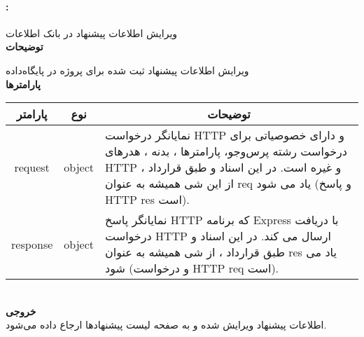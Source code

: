 \paragraph{:}
ویرایش اطلاعات پیشنهاد در بانک اطلاعات
\\
\textbf{توضیحات}
\hr
\begin{flushleft}
	\framebox[.9\textwidth][l]{
		\lr{
			\textcolor{type}{void}
			\textcolor{func}{postEditRequest}
			\textcolor{symb}{(}
			\textcolor{type}{object}
			\textcolor{arg}{request}
			\textcolor{symb}{,}
			\textcolor{type}{object}
			\textcolor{arg}{response}
			\textcolor{symb}{);}
		}
	}
\end{flushleft}
ویرایش اطلاعات پیشنهاد ثبت شده برای پروژه در پایگاه‌داده
\\
\textbf{پارامترها}
\hr \\[10pt]
\begin{tabular}{|m{4cm}|m{3cm}|m{10cm}|}
	\hline
	\multicolumn{1}{|c}{پارامتر}
	&
	\multicolumn{1}{|c}{نوع}
	&
	\multicolumn{1}{|c|}{توضیحات}
	\\
	\hline
	\multicolumn{1}{|c}{request}
	&
	\multicolumn{1}{|c|}{object}
	&
	نمایانگر درخواست HTTP و دارای خصوصیاتی برای درخواست رشته پرس‌و‌جو، پارامترها ، بدنه ، هدرهای HTTP و غیره است.
	در این اسناد و طبق قرارداد ، از این شی همیشه به عنوان req یاد می شود (و پاسخ HTTP res است).
	\\
	\hline
	\multicolumn{1}{|c}{response}
	&
	\multicolumn{1}{|c|}{object}
	&
	نمایانگر پاسخ HTTP که برنامه Express با دریافت درخواست HTTP ارسال می کند.
	در این اسناد و طبق قرارداد ، از شی همیشه به عنوان res یاد می شود (و درخواست HTTP req است).
	\\
	\hline
\end{tabular}
\\[10pt]
\textbf{خروجی}
\hr \\
اطلاعات پیشنهاد ویرایش شده و به صفحه لیست پیشنهاد‌ها ارجاع داده می‌شود.

